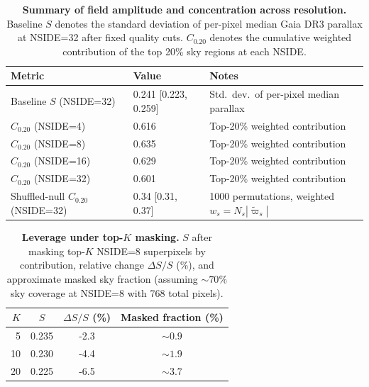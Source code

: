 \begin{table}[t]
\centering
\caption{\textbf{Summary of field amplitude and concentration across resolution.} Baseline $S$ denotes the standard deviation of per-pixel median Gaia DR3 parallax at NSIDE=32 after fixed quality cuts. $C_{0.20}$ denotes the cumulative weighted contribution of the top 20\% sky regions at each NSIDE.}
\label{tab:summary_concentration}
\begin{tabular}{lll}
\toprule
Metric & Value & Notes \\
\midrule
Baseline $S$ (NSIDE=32)          & 0.241 [0.223, 0.259]          & Std.\ dev.\ of per-pixel median parallax \\
$C_{0.20}$ (NSIDE=4)             & 0.616             & Top-20\% weighted contribution \\
$C_{0.20}$ (NSIDE=8)             & 0.635             & Top-20\% weighted contribution \\
$C_{0.20}$ (NSIDE=16)            & 0.629             & Top-20\% weighted contribution \\
$C_{0.20}$ (NSIDE=32)            & 0.601             & Top-20\% weighted contribution \\
Shuffled-null $C_{0.20}$ (NSIDE=32) & 0.34 [0.31, 0.37] & 1000 permutations, weighted $w_s = N_s|\tilde{\varpi}_s|$ \\
\bottomrule
\end{tabular}
\end{table}

\begin{table}[t]
\centering
\caption{\textbf{Leverage under top-$K$ masking.} $S$ after masking top-$K$ NSIDE=8 superpixels by contribution, relative change $\Delta S/S$ (\%), and approximate masked sky fraction (assuming $\sim 70\%$ sky coverage at NSIDE=8 with 768 total pixels).}
\label{tab:leverage_masking}
\begin{tabular}{rccc}
\toprule
$K$ & $S$ & $\Delta S/S$ (\%) & Masked fraction (\%) \\
\midrule
5  & 0.235 & -2.3 & $\sim 0.9$ \\
10 & 0.230 & -4.4 & $\sim 1.9$ \\
20 & 0.225 & -6.5 & $\sim 3.7$ \\
\bottomrule
\end{tabular}
\end{table}

